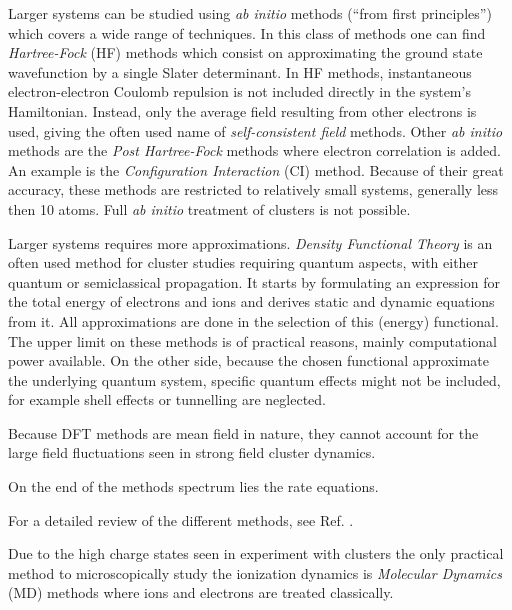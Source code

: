 Larger systems can be studied using \textit{ab initio} methods (``from
first principles'') which covers a wide range of techniques. In this class of
methods one can find \textit{Hartree-Fock} (HF) methods which consist on
approximating the ground state wavefunction by a single Slater determinant.
In HF methods, instantaneous electron-electron Coulomb repulsion is not
included directly in the system's Hamiltonian. Instead, only the average field
resulting from other electrons is used, giving the often used name of
\textit{self-consistent field} methods. Other \textit{ab
initio} methods are the \textit{Post Hartree-Fock} methods where electron
correlation is added. An example is the \textit{Configuration Interaction} (CI)
method. Because of their great accuracy, these methods are restricted to
relatively small systems, generally less then 10 atoms. Full \textit{ab initio}
treatment of clusters is not possible.

Larger systems requires more approximations. \textit{Density Functional Theory}
is an often used method for cluster studies requiring quantum aspects, with
either quantum or semiclassical propagation. It starts by formulating an
expression for the total energy of electrons and ions and derives static and
dynamic equations from it. All approximations are done in the selection of this
(energy) functional. The upper limit on these methods is of practical reasons,
mainly computational power available. On the other side, because the chosen
functional approximate the underlying quantum system, specific quantum effects
might not be included, for example shell effects or tunnelling are neglected.

Because DFT methods are mean field in nature, they cannot account for the large
field fluctuations seen in strong field cluster dynamics.

On the end of the methods spectrum lies the rate equations.






For a detailed review of the different methods, see Ref. \cite{Fennel2010}.



Due to the high charge states seen in experiment with clusters the only
practical method to microscopically study the ionization dynamics is
\textit{Molecular Dynamics} (MD) methods where ions and electrons are treated
classically.

